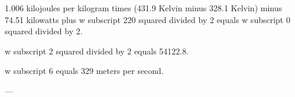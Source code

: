 1.006 kilojoules per kilogram times (431.9 Kelvin minus 328.1 Kelvin) minus 74.51 kilowatts plus w subscript 220 squared divided by 2 equals w subscript 0 squared divided by 2.  

w subscript 2 squared divided by 2 equals 54122.8.  

w subscript 6 equals 329 meters per second.  

---